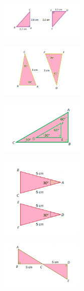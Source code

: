 {{\begin{multicols}{2}
\begin{escolha}
\item
\begin{figure}[H]
\centering\includegraphics[width=4cm]{./imgSAEB_8_MAT/media/image19.png}
\end{figure}  
\item
\begin{figure}[H]
\centering\includegraphics[width=4cm]{./imgSAEB_8_MAT/media/image20.png}
\end{figure}  
\item
\begin{figure}[H]
\centering\includegraphics[width=4cm]{./imgSAEB_8_MAT/media/image21.png}
\end{figure}  
\item
\begin{figure}[H]
\centering\includegraphics[width=4cm]{./imgSAEB_8_MAT/media/image22.png}
\end{figure}  
\item
\begin{figure}[H]
\centering\includegraphics[width=4cm]{./imgSAEB_8_MAT/media/image23.png}
\end{figure}  
\end{escolha}
\end{multicols}





}}
